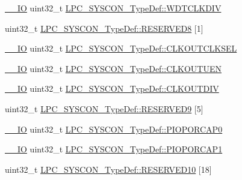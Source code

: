 \begin{DoxyCompactItemize}
\item 
\hyperlink{group___c_m_s_i_s__core__definitions_gaec43007d9998a0a0e01faede4133d6be}{\+\_\+\+\_\+\+IO} uint32\+\_\+t \hyperlink{group___l_p_c11xx___definitions_ga5d787d109526ad3eb0278790fb71a58b}{L\+P\+C\+\_\+\+S\+Y\+S\+C\+O\+N\+\_\+\+Type\+Def\+::\+W\+D\+T\+C\+L\+K\+D\+IV}
\item 
uint32\+\_\+t \hyperlink{group___l_p_c11xx___definitions_ga03a77dbffb206de6e41e18c6bc3b4895}{L\+P\+C\+\_\+\+S\+Y\+S\+C\+O\+N\+\_\+\+Type\+Def\+::\+R\+E\+S\+E\+R\+V\+E\+D8} \mbox{[}1\mbox{]}
\item 
\hyperlink{group___c_m_s_i_s__core__definitions_gaec43007d9998a0a0e01faede4133d6be}{\+\_\+\+\_\+\+IO} uint32\+\_\+t \hyperlink{group___l_p_c11xx___definitions_gac29fe890ede735895af857345a6d6cb2}{L\+P\+C\+\_\+\+S\+Y\+S\+C\+O\+N\+\_\+\+Type\+Def\+::\+C\+L\+K\+O\+U\+T\+C\+L\+K\+S\+EL}
\item 
\hyperlink{group___c_m_s_i_s__core__definitions_gaec43007d9998a0a0e01faede4133d6be}{\+\_\+\+\_\+\+IO} uint32\+\_\+t \hyperlink{group___l_p_c11xx___definitions_ga6e2e61850e73ee4ba00145e337568cdf}{L\+P\+C\+\_\+\+S\+Y\+S\+C\+O\+N\+\_\+\+Type\+Def\+::\+C\+L\+K\+O\+U\+T\+U\+EN}
\item 
\hyperlink{group___c_m_s_i_s__core__definitions_gaec43007d9998a0a0e01faede4133d6be}{\+\_\+\+\_\+\+IO} uint32\+\_\+t \hyperlink{group___l_p_c11xx___definitions_ga88ef5401531552a52e072c288d2e0900}{L\+P\+C\+\_\+\+S\+Y\+S\+C\+O\+N\+\_\+\+Type\+Def\+::\+C\+L\+K\+O\+U\+T\+D\+IV}
\item 
uint32\+\_\+t \hyperlink{group___l_p_c11xx___definitions_ga92efb41fb5e7ec4f9840b6be6d86cbaa}{L\+P\+C\+\_\+\+S\+Y\+S\+C\+O\+N\+\_\+\+Type\+Def\+::\+R\+E\+S\+E\+R\+V\+E\+D9} \mbox{[}5\mbox{]}
\item 
\hyperlink{group___c_m_s_i_s__core__definitions_gaec43007d9998a0a0e01faede4133d6be}{\+\_\+\+\_\+\+IO} uint32\+\_\+t \hyperlink{group___l_p_c11xx___definitions_gaf602252d93ac876feb330a5710324f43}{L\+P\+C\+\_\+\+S\+Y\+S\+C\+O\+N\+\_\+\+Type\+Def\+::\+P\+I\+O\+P\+O\+R\+C\+A\+P0}
\item 
\hyperlink{group___c_m_s_i_s__core__definitions_gaec43007d9998a0a0e01faede4133d6be}{\+\_\+\+\_\+\+IO} uint32\+\_\+t \hyperlink{group___l_p_c11xx___definitions_gada09efd8706154dd5e6d2675e612619f}{L\+P\+C\+\_\+\+S\+Y\+S\+C\+O\+N\+\_\+\+Type\+Def\+::\+P\+I\+O\+P\+O\+R\+C\+A\+P1}
\item 
uint32\+\_\+t \hyperlink{group___l_p_c11xx___definitions_ga60a24e7e1ad0983bd355423fd7119da7}{L\+P\+C\+\_\+\+S\+Y\+S\+C\+O\+N\+\_\+\+Type\+Def\+::\+R\+E\+S\+E\+R\+V\+E\+D10} \mbox{[}18\mbox{]}

\end{DoxyCompactItemize}
